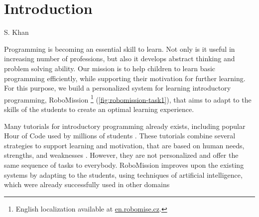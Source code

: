\chapter{Introduction}
\label{chap:introduction}


{S. Khan}

Programming is becoming an essential skill to learn.
Not only is it useful in increasing number of professions,
but also it develops abstract thinking and problem solving ability. %
Our mission is to help children to learn basic programming efficiently,
while supporting their motivation for further learning.
For this purpose, we build a personalized system for learning introductory
programming, RoboMission%
\footnote{English localization available at \url{en.robomise.cz}.}
(\cref{fig:robomission-task1}),
that aims to adapt to the skills of the students
to create an optimal learning experience.

Many tutorials for introductory programming already exists,
including popular Hour of Code used by millions of students \cite{hour-of-code}.
These tutorials combine several strategies to support learning and motivation,
that are based on human needs, strengths, and weaknesses
\cite{lowering-barriers}.
However, they are not personalized and offer the same sequence of tasks
to everybody.
RoboMission improves upon the existing systems by adapting to the
students, using techniques of artificial intelligence,
which were already successfully used in other domains
\cite{mathsgarden, alg.evaluation-geography, matmat.response-times}


